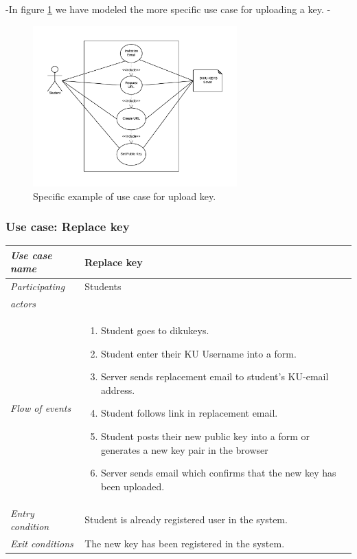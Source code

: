 \documentclass[11pt,a4paper]{report}
\begin{document}
-In figure \ref{fig:use_case_diagram_example} we have modeled the more specific use case for uploading a key.
-
\begin{figure}[H]
    \centering
    \includegraphics[width=0.7\textwidth]{pictures/use_case_pksu_del2_b_example}
    \caption{Specific example of use case for upload key.}
    \label{fig:use_case_diagram_example}
\end{figure}

\subsubsection{Use case: Replace key}
\begin{tabular}{l p{}}
    \toprule
    \textit{Use case name} & Replace key \\
    \midrule
    \textit{Participating} & Students \\
    \textit{actors} & \\
    \midrule
    \textit{Flow of events} &
    \vspace{-6.7mm} \begin{enumerate}
        \item Student goes to dikukeys.
        \item Student enter their KU Username into a form.
        \item Server sends replacement email to student's KU-email address.
        \item Student follows link in replacement email.
        \item Student posts their new public key into a form or generates a new key pair in the browser
        \item Server sends email which confirms that the new key has been uploaded.
    \end{enumerate}
    \\
    \midrule
    \textit{Entry condition} & Student is already registered user in the system. \\
    \midrule
    \textit{Exit conditions} & The new key has been registered in the system. \\
    \bottomrule
\end{tabular}
\end{document}
